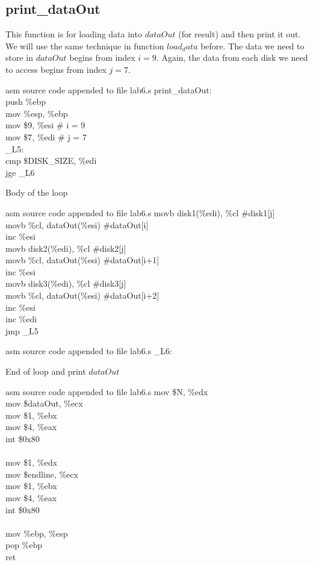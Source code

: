 \documentclass{article}
\begin{document}
\subsection{print\_dataOut}
This function is for loading data into $dataOut$ (for result) and then print it out. We will use the same technique in function $load_data$ before. The data we need to store in $dataOut$ begins from index $i=9$. Again, the data from each disk we need to access begins from index $j=7$.
\begin{multicols}{2}
\begin{GFT}{asm source code appended to file lab6.s}
\+print\_dataOut:\\
\+push \%ebp\\
\+mov \%esp, \%ebp\\
\+mov \$9, \%esi	\# i = 9\\
\+mov \$7, \%edi	\# j = 7\\
\+\_L5:\\
\+cmp \$DISK\_SIZE, \%edi	\\
\+jge \_L6\\
\end{GFT}
Body of the loop
\begin{GFT}{asm source code appended to file lab6.s}
\+movb disk1(\%edi), \%cl	\#disk1[j]\\
\+movb \%cl, dataOut(\%esi)	\#dataOut[i]\\
\+inc \%esi\\
\+movb disk2(\%edi), \%cl	\#disk2[j]\\
\+movb \%cl, dataOut(\%esi)	\#dataOut[i+1]\\
\+inc \%esi\\
\+movb disk3(\%edi), \%cl	\#disk3[j]\\
\+movb \%cl, dataOut(\%esi)	\#dataOut[i+2]\\
\+inc \%esi\\
\+inc \%edi\\
\+jmp \_L5\\
\end{GFT}
\columnbreak
\begin{GFT}{asm source code appended to file lab6.s}
\+\_L6:\\
\end{GFT}
End of loop and print $dataOut$
\begin{GFT}{asm source code appended to file lab6.s}
\+mov \$N, \%edx\\
\+mov \$dataOut, \%ecx\\
\+mov \$1, \%ebx\\
\+mov \$4, \%eax\\
\+int \$0x80\\
\+\\
\+mov \$1, \%edx\\
\+mov \$endline, \%ecx\\
\+mov \$1, \%ebx\\
\+mov \$4, \%eax\\
\+int \$0x80\\
\+\\
\+mov \%ebp, \%esp\\
\+pop \%ebp\\
\+ret\\
\end{GFT}
\end{multicols}
\clearpage
\end{document}
